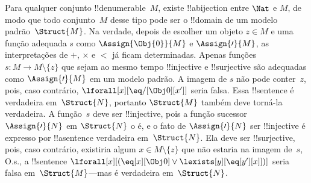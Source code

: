 \documentclass[../../../include/open-logic-section]{subfiles}
\begin{document}
\begin{explain}
Para qualquer conjunto !!{denumerable}~$M$, existe !!a{bijection}
entre $\Nat$ e $M$, de modo que todo conjunto~$M$ desse tipo pode ser
o !!{domain} de um modelo padrão~$\Struct{M}$. Na verdade, depois de
escolher um objeto $z \in M$ e uma função adequada $s$ como
$\Assign{\Obj{0}}{M}$ e $\Assign{\prime}{M}$, as interpretações de
$+$, $\times$ e $<$ já ficam determinadas. Apenas funções
$s\colon M \to M \setminus \{z\}$ que sejam ao mesmo tempo
!!{injective} e !!{surjective} são adequadas como
$\Assign{\prime}{M}$ em um modelo padrão. A imagem de $s$ não pode
conter~$z$, pois, caso contrário, $\lforall[x][\eq/[\Obj 0][x']]$
seria falsa. Essa !!{sentence} é verdadeira em~$\Struct{N}$, portanto
$\Struct{M}$ também deve torná-la verdadeira. A função~$s$ deve ser
!!{injective}, pois a função sucessor~$\Assign{\prime}{N}$ em
$\Struct{N}$ o é, e o fato de $\Assign{\prime}{N}$ ser !!{injective}
é expresso por !!a{sentence} verdadeira em~$\Struct{N}$. Ela deve ser
!!{surjective}, pois, caso contrário, existiria algum $x \in M
\setminus \{z\}$ que não estaria na imagem de~$s$, O.s.\@, a
!!{sentence} $\lforall[x][(\eq[x][\Obj 0] \lor
\lexists[y][\eq[y'][x]])]$ seria falsa em~$\Struct{M}$---mas é
verdadeira em~$\Struct{N}$.
\end{explain}
\end{document}
